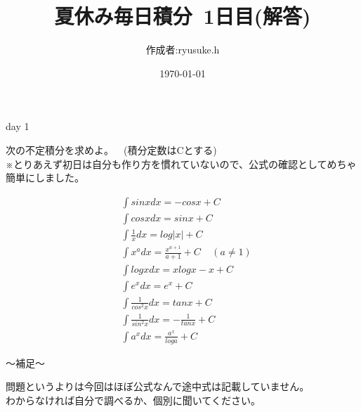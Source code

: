 \documentclass[12pt,a4paper]{jsarticle}
\title{夏休み毎日積分~1日目(解答)}
\date{\today}
\begin{document}
\maketitle
\begin{flushright}
    \author{作成者:ryusuke.h}
\end{flushright}
\begin{itembox}[c]{day 1 }
    \begin{center}
        次の不定積分を求めよ。~~(積分定数はCとする)\\
        ※とりあえず初日は自分も作り方を慣れていないので、公式の確認としてめちゃ簡単にしました。
    \end{center}
\end{itembox}
\begin{align*}
    &\int sinx dx = -cosx + C \\
    &\int cosx dx = sinx + C \\
    &\int \frac{1}{x} dx = log|x| + C \\
    &\int x^a dx = \frac{x^{a+1}}{a+1} + C ~~~~~ (a\neq1) \\
    &\int logx dx = xlogx - x + C \\
    &\int e^x dx = e^x + C \\
    &\int \frac{1}{cos^2x} dx = tanx + C　\\
    &\int \frac{1}{sin^2x} dx = -\frac{1}{tanx} + C \\
    &\int a^x dx = \frac{a^x}{loga} + C
\end{align*}
\begin{boxnote}
    〜補足〜
    \begin{center}
        問題というよりは今回はほぼ公式なんで途中式は記載していません。 \\
        わからなければ自分で調べるか、個別に聞いてください。
    \end{center}
\end{boxnote}
\end{document}
